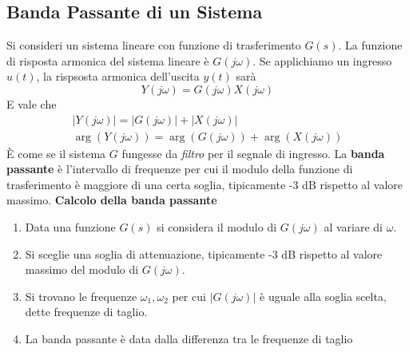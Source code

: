 \documentclass[10pt, letterpaper]{report}
\begin{document}
 \subsection{Banda Passante di un Sistema}
Si consideri un sistema lineare con funzione di trasferimento $G(s)$. La
funzione di risposta armonica del sistema lineare è $G(j\omega)$.\acc 
Se applichiamo un ingresso $u(t)$, la rispsosta armonica dell'uscita $y(t)$ sarà $$ Y(j\omega)=G(j\omega)X(j\omega)$$
E vale che 
$$ \begin{matrix}
  |Y(j\omega)|=   |G(j\omega)|+|X(j\omega)|
\\
\arg(Y(j\omega))=\arg(G(j\omega))+\arg(X(j\omega))
\end{matrix}$$
È come se il sistema $G$ fungesse da \textit{filtro} per il segnale di ingresso. La \textbf{banda passante} è l'intervallo di frequenze per cui il modulo della funzione di trasferimento è maggiore di una certa soglia, tipicamente -3 dB rispetto al valore massimo.\acc 
\textbf{Calcolo della banda passante}\begin{enumerate}
    \item Data una funzione $G(s)$ si considera il modulo di $G(j\omega)$ al variare di $\omega$.
    \item Si sceglie una soglia di attenuazione, tipicamente -3 dB rispetto al valore massimo del modulo di $G(j\omega)$. 
    \item Si trovano le frequenze $\omega_1,\omega_2$ per cui $|G(j\omega)|$ è uguale alla soglia scelta, dette frequenze di taglio.
    \item La banda passante è data dalla differenza tra le frequenze di taglio
\end{enumerate}

 \flowerLine 
\end{document}
